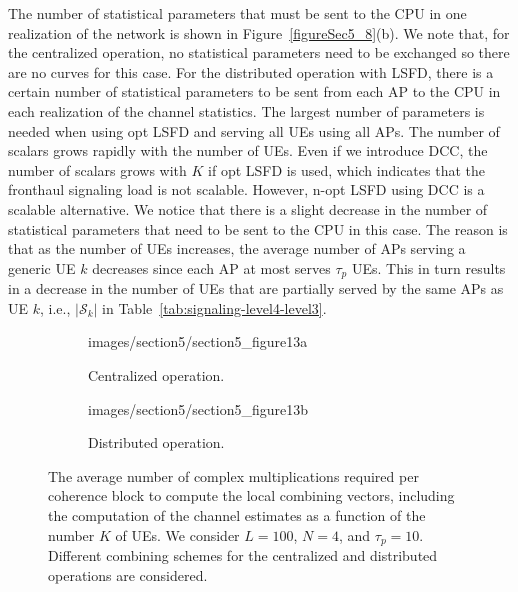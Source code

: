 The number of statistical parameters that must be sent to the CPU in one realization of the network is shown in Figure~\ref{figureSec5_8}(b). We note that, for the centralized operation, no statistical parameters need to be exchanged so there are no curves for this case. 
For the distributed operation with LSFD, there is a certain number of statistical parameters to be sent from each AP to the CPU in each realization of the channel statistics. The largest number of parameters is needed when using opt LSFD and serving all UEs using all APs. The number of scalars grows rapidly with the number of UEs.
Even if we introduce DCC, the number of scalars grows with $K$ if opt LSFD is used, which indicates that the fronthaul signaling load is not scalable. However, n-opt LSFD using DCC is a scalable alternative. We notice that there is a slight decrease in the number of statistical parameters that need to be sent to the CPU in this case. The reason is that as the number of UEs increases, the average number of APs serving a generic UE $k$ decreases since each AP at most serves $\tau_p$ UEs. This in turn results in a decrease in the number of UEs that are partially served by the same APs as UE $k$, i.e., $|\mathcal{S}_k|$ in Table~\ref{tab:signaling-level4-level3}.


\begin{figure}[p!]
        \begin{subfigure}[b]{\columnwidth} \centering 
	\begin{overpic}[width=0.88\columnwidth,tics=10]{images/section5/section5_figure13a}
\end{overpic} \label{figureSec5_9a}
                \caption{Centralized operation.} 
                \vspace{4mm}
        \end{subfigure} 
        \begin{subfigure}[b]{\columnwidth} \centering 
	\begin{overpic}[width=0.88\columnwidth,tics=10]{images/section5/section5_figure13b}
\end{overpic} \label{figureSec5_9b}
                \caption{Distributed operation.} 
        \end{subfigure} 
	\caption{The average number of complex multiplications required per coherence block to compute the local combining vectors, including the computation of the channel estimates as a function of the number $K$ of UEs. We consider $L=100$, $N=4$, and $\tau_p=10$. Different combining schemes for the centralized and distributed operations are considered.}\label{figureSec5_9}
\end{figure}

